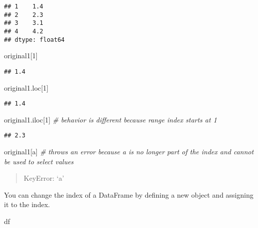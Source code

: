 \documentclass[
]{book}
\newenvironment{Shaded}{\begin{snugshade}}{\end{snugshade}}
\newcommand{\CommentTok}[1]{\textcolor[rgb]{0.56,0.35,0.01}{\textit{#1}}}
\newcommand{\DecValTok}[1]{\textcolor[rgb]{0.00,0.00,0.81}{#1}}
\newcommand{\NormalTok}[1]{#1}
\newcommand{\StringTok}[1]{\textcolor[rgb]{0.31,0.60,0.02}{#1}}
\begin{document}
\begin{verbatim}
## 1    1.4
## 2    2.3
## 3    3.1
## 4    4.2
## dtype: float64
\end{verbatim}

\begin{Shaded}
\begin{Highlighting}[]
\NormalTok{original1[}\DecValTok{1}\NormalTok{]}
\end{Highlighting}
\end{Shaded}

\begin{verbatim}
## 1.4
\end{verbatim}

\begin{Shaded}
\begin{Highlighting}[]
\NormalTok{original1.loc[}\DecValTok{1}\NormalTok{]}
\end{Highlighting}
\end{Shaded}

\begin{verbatim}
## 1.4
\end{verbatim}

\begin{Shaded}
\begin{Highlighting}[]
\NormalTok{original1.iloc[}\DecValTok{1}\NormalTok{] }\CommentTok{\# behavior is different because range index starts at 1}
\end{Highlighting}
\end{Shaded}

\begin{verbatim}
## 2.3
\end{verbatim}

\begin{Shaded}
\begin{Highlighting}[]
\NormalTok{original1[}\StringTok{\textquotesingle{}a\textquotesingle{}}\NormalTok{] }\CommentTok{\# throws an error because \textquotesingle{}a\textquotesingle{} is no longer part of the index and cannot be used to select values}
\end{Highlighting}
\end{Shaded}

\begin{quote}
KeyError: `a'
\end{quote}

You can change the index of a DataFrame by defining a new object and assigning it to the index.

\begin{Shaded}
\begin{Highlighting}[]
\NormalTok{df}
\end{Highlighting}
\end{Shaded}
\end{document}
